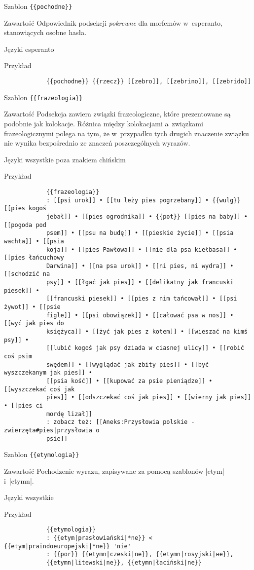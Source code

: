 \spacer
\begin{opis}
	\item[Szablon] \verb|{{pochodne}}|
	\item[Zawartość] Odpowiednik podsekcji \emph{pokrewne} dla morfemów w~esperanto, stanowiących osobne hasła.
	\item[Języki] esperanto
	\item[Przykład]
		\begin{verbatim}
			{{pochodne}} {{rzecz}} [[zebro]], [[zebrino]], [[zebrido]]
		\end{verbatim}
\end{opis}
\spacer
\begin{opis}
	\item[Szablon] \verb|{{frazeologia}}|
	\item[Zawartość] Podsekcja zawiera związki frazeologiczne, które prezentowane są podobnie jak kolokacje. Różnica między kolokacjami a~związkami frazeologicznymi polega na tym, że w~przypadku tych drugich znaczenie związku nie wynika bezpośrednio ze znaczeń poszczególnych wyrazów.
	\item[Języki] wszystkie poza znakiem chińskim
	\item[Przykład]
		\begin{verbatim}
			{{frazeologia}}
			: [[psi urok]] • [[tu leży pies pogrzebany]] • {{wulg}} [[pies kogoś
			jebał]] • [[pies ogrodnika]] • {{pot}} [[pies na baby]] • [[pogoda pod
			psem]] • [[psu na budę]] • [[pieskie życie]] • [[psia wachta]] • [[psia
			koja]] • [[pies Pawłowa]] • [[nie dla psa kiełbasa]] • [[pies łańcuchowy
			Darwina]] • [[na psa urok]] • [[ni pies, ni wydra]] • [[schodzić na
			psy]] • [[łgać jak pies]] • [[delikatny jak francuski piesek]] •
			[[francuski piesek]] • [[pies z nim tańcował]] • [[psi żywot]] • [[psie
			figle]] • [[psi obowiązek]] • [[całować psa w nos]] • [[wyć jak pies do
			księżyca]] • [[żyć jak pies z kotem]] • [[wieszać na kimś psy]] •
			[[lubić kogoś jak psy dziada w ciasnej ulicy]] • [[robić coś psim
			swędem]] • [[wyglądać jak zbity pies]] • [[być wyszczekanym jak pies]] •
			[[psia kość]] • [[kupować za psie pieniądze]] • [[wyszczekać coś jak
			pies]] • [[odszczekać coś jak pies]] • [[wierny jak pies]] • [[pies ci
			mordę lizał]]
			: zobacz też: [[Aneks:Przysłowia polskie - zwierzęta#pies|przysłowia o
			psie]]
		\end{verbatim}
\end{opis}
\spacer
\begin{opis}
	\item[Szablon] \verb|{{etymologia}}|
	\item[Zawartość] Pochodzenie wyrazu, zapisywane za pomocą szablonów \kod|{{etym}}| i~\kod|{{etymn}}|.
	\item[Języki] wszystkie
	\item[Przykład]
		\begin{verbatim}
			{{etymologia}}
			: {{etym|prasłowiański|*ne}} < {{etym|praindoeuropejski|*ne}} 'nie'
			: {{por}} {{etymn|czeski|ne}}, {{etymn|rosyjski|не}},
			{{etymn|litewski|ne}}, {{etymn|łaciński|ne}}
		\end{verbatim}
\end{opis}
